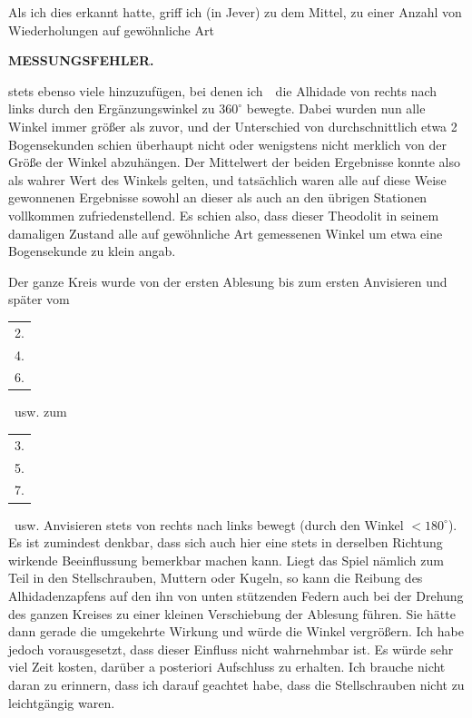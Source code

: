 \par\noindent\hspace*{\parindent}Als ich dies erkannt hatte, griff ich (in Jever) zu dem Mittel, zu einer Anzahl von Wiederholungen auf gewöhnliche Art

\par\clearpage
\noindent\null\hfill{\small\textbf{MESSUNGSFEHLER.}}\hfill{}\par\medskip
\noindent stets ebenso viele hinzuzufügen, bei denen ich\ \ die Alhidade von rechts nach links durch den Ergänzungswinkel zu $360^\circ$ bewegte. Dabei wurden nun alle Winkel immer größer als zuvor, und der Unterschied von durchschnittlich etwa 2 Bogensekunden schien überhaupt nicht oder wenigstens nicht merklich von der Größe der Winkel abzuhängen. Der Mittelwert der beiden Ergebnisse konnte also als wahrer Wert des Winkels gelten, und tatsächlich waren alle auf diese Weise gewonnenen Ergebnisse sowohl an dieser als auch an den übrigen Stationen vollkommen zufriedenstellend. Es schien also, dass dieser Theodolit in seinem damaligen Zustand alle auf gewöhnliche Art gemessenen Winkel um etwa eine Bogensekunde zu klein angab.

\par\noindent\hspace*{\parindent}Der ganze Kreis wurde von der ersten Ablesung bis zum ersten\linebreak
Anvisieren und später vom \begin{tabular}[c]{@{}c@{}}2.\\4.\\6.\end{tabular}\ usw. zum \begin{tabular}[c]{@{}c@{}}3.\\5.\\7.\end{tabular}\ usw. Anvisieren stets von\linebreak
rechts nach links bewegt (durch den Winkel $<180^\circ$). Es ist zumindest denkbar, dass sich auch hier eine stets in derselben Richtung wirkende Beeinflussung bemerkbar machen kann. Liegt das Spiel nämlich zum Teil in den Stellschrauben, Muttern oder Kugeln, so kann die Reibung des Alhidadenzapfens auf den ihn von unten stützenden Federn auch bei der Drehung des ganzen Kreises zu einer kleinen Verschiebung der Ablesung führen. Sie hätte dann gerade die umgekehrte Wirkung und würde die Winkel vergrößern. Ich habe jedoch vorausgesetzt, dass dieser Einfluss nicht wahrnehmbar ist. Es würde sehr viel Zeit kosten, darüber a posteriori Aufschluss zu erhalten. Ich brauche nicht daran zu erinnern, dass ich  darauf geachtet habe, dass die Stellschrauben nicht zu leichtgängig waren.

